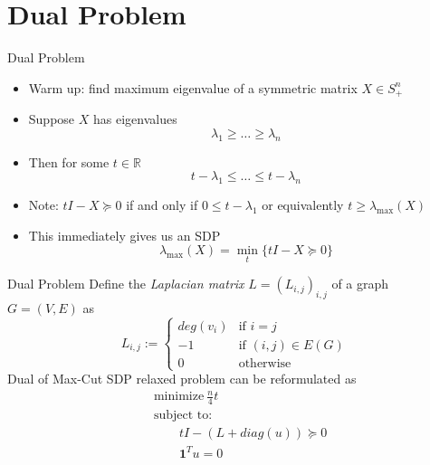 \documentclass[10pt, xcolor={dvipsnames}]{beamer}
\newcommand{\vect}[1]{\boldsymbol{#1}}
\begin{document}
\section{Dual Problem}
\begin{frame}{Dual Problem}
\begin{itemize}
\item Warm up: find maximum eigenvalue of a symmetric matrix $X \in S^{n}_{+}$
\item Suppose $X$ has eigenvalues
\begin{equation}
\lambda_{1} \geq \dots \geq \lambda_{n}
\end{equation}
\item Then for some $t \in \mathbb{R}$
\begin{equation}
t - \lambda_{1} \leq \dots \leq t - \lambda_{n}
\end{equation}
\item Note: $t I - X \succeq 0$ if and only if $0 \leq t - \lambda_{1}$ or equivalently $t \geq \lambda_{\max}(X)$
\item This immediately gives us an SDP
\begin{equation}
\lambda_{\max}(X) = \min_{t}\lbrace t I - X \succeq 0 \rbrace   
\end{equation}
\end{itemize}
\end{frame}

\begin{frame}{Dual Problem}
Define the {\it Laplacian matrix} $L = (L_{i,j})_{i,j}$ of a graph $G = (V, E)$ as
\begin{equation}
L_{i,j} := \begin{cases}
deg(v_i)   &\text{if $i = j$}\\
-1  &\text{if $(i, j) \in E(G)$}\\
0   &\text{otherwise}
\end{cases}
\end{equation}
Dual of Max-Cut SDP relaxed problem can be reformulated as
\begin{align}
& \text{minimize} \ \frac{n}{4} t \nonumber\\
& \text{subject to: } \tag{D'}\\
& \qquad t I - (L + diag(u)) \succeq 0 \nonumber\\
& \qquad \vect{1}^{T}u = 0 \nonumber
\end{align}
\end{frame}
\end{document}
